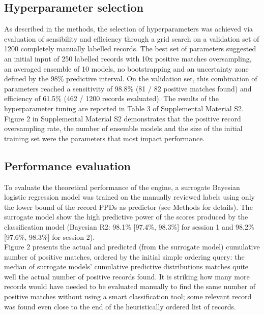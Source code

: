 \documentclass{article}
\begin{document}
\hypertarget{hyperparameter-selection}{%
\subsection{Hyperparameter selection}\label{hyperparameter-selection}}

As described in the methods, the selection of hyperparameters was
achieved via evaluation of sensibility and efficiency through a grid
search on a validation set of 1200 completely manually labelled records.
The best set of parameters suggested an initial input of 250 labelled
records with 10x positive matches oversampling, an averaged ensemble of
10 models, no bootstrapping and an uncertainty zone defined by the 98\%
predictive interval. On the validation set, this combination of
parameters reached a sensitivity of 98.8\% (81 / 82 positive matches
found) and efficiency of 61.5\% (462 / 1200 records evaluated). The
results of the hyperparameter tuning are reported in Table 3 of
Supplemental Material S2. Figure 2 in Supplemental Material S2
demonstrates that the positive record oversampling rate, the number of
ensemble models and the size of the initial training set were the
parameters that most impact performance.

\hypertarget{performance-evaluation-1}{%
\subsection{Performance evaluation}\label{performance-evaluation-1}}

To evaluate the theoretical performance of the engine, a surrogate
Bayesian logistic regression model was trained on the manually reviewed
labels using only the lower bound of the record PPDs as predictor (see
Methods for details). The surrogate model show the high predictive power
of the scores produced by the classification model (Bayesian R2: 98.1\%
{[}97.4\%, 98.3\%{]} for session 1 and 98.2\% {[}97.6\%, 98.3\%{]} for
session 2).\\

Figure 2 presents the actual and predicted (from the surrogate model)
cumulative number of positive matches, ordered by the initial simple
ordering query: the median of surrogate models' cumulative predictive
distributions matches quite well the actual number of positive records
found. It is striking how many more records would have needed to be
evaluated manually to find the same number of positive matches without
using a smart classification tool; some relevant record was found even
close to the end of the heuristically ordered list of records.\\
\end{document}
